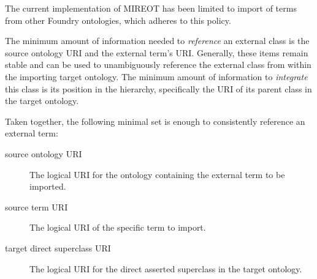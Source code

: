 \documentclass[a4paper,10pt,twocolumn]{article}
\begin{document}






The current implementation of \ac{MIREOT} has been limited to import of terms from other Foundry ontologies, which adheres to this policy.




The minimum amount of information needed to \textit{reference} an external class is the source ontology URI and the external term's URI. %
Generally, these items remain stable and can be used to unambiguously reference the external class from within the importing target ontology.
The minimum amount of information to \textit{integrate} this class is its position in the hierarchy, specifically the URI of its parent class in the target ontology. %


Taken together, the following minimal set is enough to consistently reference an external term:
\begin{description}
 \item[source ontology URI] The logical URI for the ontology containing the external term to be imported. %
 \item[source term URI] The logical URI of the specific term to import. %
 \item[target direct superclass URI] The logical URI for the direct asserted superclass in the target ontology. %
 \end{description} 
 
\end{document}
